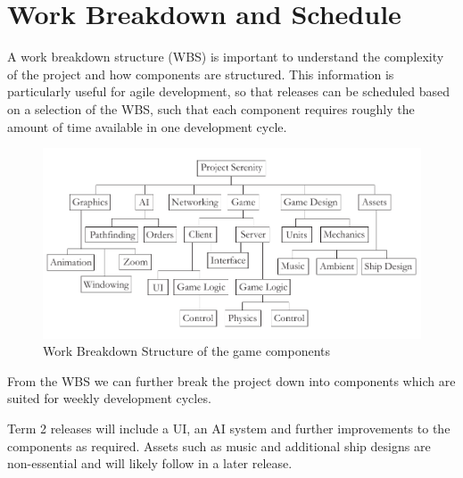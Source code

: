 \section{Work Breakdown and Schedule}
A work breakdown structure (WBS) is important to understand the complexity of the project and how components are structured. This information is particularly useful for agile development, so that releases can be scheduled based on a selection of the WBS,
 such that each component requires roughly the amount of time available in one development cycle.

\begin{figure}[h!]
	\includegraphics{res/wbs}
	\caption{Work Breakdown Structure of the game components}
\end{figure}

From the WBS we can further break the project down into components which are suited for weekly development cycles.

Term 2 releases will include a UI, an AI system and further improvements to the components as required. Assets such as music and additional ship designs are non-essential and will likely follow in a later release.

